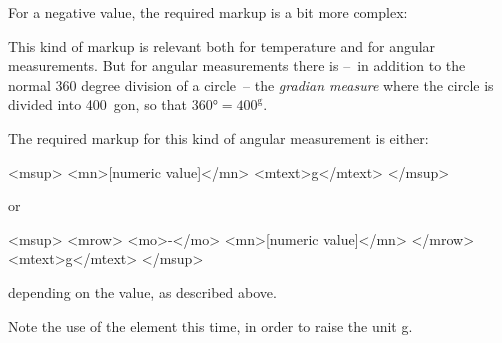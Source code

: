 \documentclass[english,a4paper,11pt]{article}
\begin{document}
\medskip
For a negative value, the required markup is a bit more complex:
\begin{kodeblokk}
\end{kodeblokk}


\medskip
This kind of markup is relevant both for  temperature and for angular measurements. But for angular measurements there is --~in addition to the normal 360 degree division of a circle~-- the \emph{gradian measure} where the circle is divided into 400~gon, so that $\ang{360} = 400^\text{g}$.

The required markup for this kind of angular measurement is either:
\begin{kodeblokk}
\begin{verbatimtab}[3]
<msup>
	<mn>[numeric value]</mn>
	<mtext>g</mtext>
</msup>
\end{verbatimtab}
\end{kodeblokk}
or
\begin{kodeblokk}
\begin{verbatimtab}[3]
<msup>
	<mrow>
		<mo>-</mo>
		<mn>[numeric value]</mn>
	</mrow>
	<mtext>g</mtext>
</msup>
\end{verbatimtab}
\end{kodeblokk}
depending on the value, as described above.

Note the use of the  element this time, in order to raise the unit g.
\end{document}
